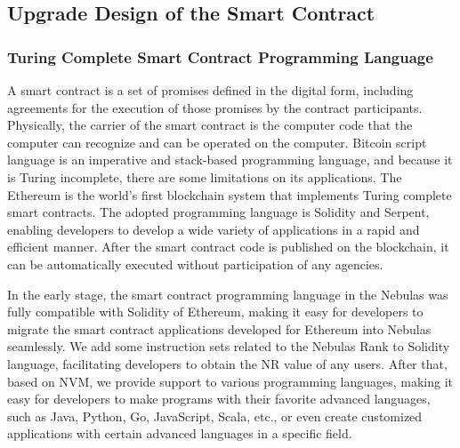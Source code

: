 \subsection{Upgrade Design of the Smart Contract}

\subsubsection{Turing Complete Smart Contract Programming Language}

A smart contract is a set of promises defined in the digital form, including agreements for the execution of those promises by the contract participants. Physically, the carrier of the smart contract is the computer code that the computer can recognize and can be operated on the computer. Bitcoin script language is an imperative and stack-based programming language, and because it is Turing incomplete, there are some limitations on its applications. The Ethereum is the world's first blockchain system that implements Turing complete smart contracts. The adopted programming language is Solidity and Serpent, enabling developers to develop a wide variety of applications in a rapid and efficient manner. After the smart contract code is published on the blockchain, it can be automatically executed without participation of any agencies.


In the early stage, the smart contract programming language in the Nebulas was fully compatible with Solidity of Ethereum, making it easy for developers to migrate the smart contract applications developed for Ethereum into Nebulas seamlessly. We add some instruction sets related to the Nebulas Rank to Solidity language, facilitating developers to obtain the NR value of any users. After that, based on NVM, we provide support to various programming languages, making it easy for developers to make programs with their favorite advanced languages, such as Java, Python, Go, JavaScript, Scala, etc., or even create customized applications with certain advanced languages in a specific field. 

